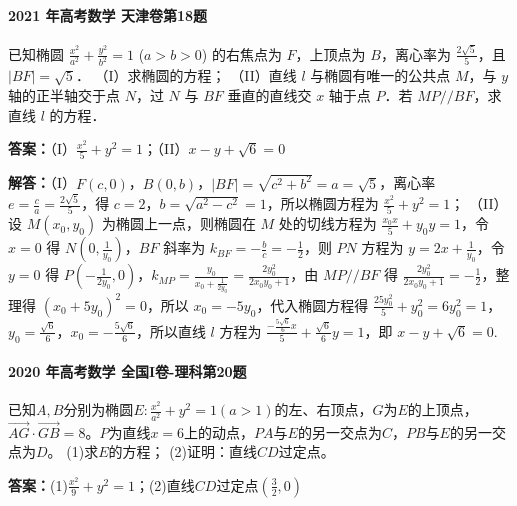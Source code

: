 \documentclass[UTF8,a4paper,11pt]{ctexart}
\begin{document}
\paragraph{2021 年高考数学 天津卷第18题}

已知椭圆 $\frac{x^2}{a^2} + \frac{y^2}{b^2} = 1$ ($a > b > 0$) 的右焦点为 $F$，上顶点为 $B$，离心率为 $\frac{2\sqrt{5}}{5}$，且 $|BF| = \sqrt{5}$．
（I）求椭圆的方程；
（II）直线 $l$ 与椭圆有唯一的公共点 $M$，与 $y$ 轴的正半轴交于点 $N$，过 $N$ 与 $BF$ 垂直的直线交 $x$ 轴于点 $P$．若 $MP // BF$，求直线 $l$ 的方程．

\textbf{答案：}（I）$\frac{x^2}{5} + y^2 = 1$；（II）$x - y + \sqrt{6} = 0$\par

\textbf{解答：}（I）$F(c,0)$，$B(0,b)$，$|BF| = \sqrt{c^2+b^2} = a = \sqrt{5}$，离心率 $e = \frac{c}{a} = \frac{2\sqrt{5}}{5}$，得 $c=2$，$b = \sqrt{a^2-c^2} = 1$，所以椭圆方程为 $\frac{x^2}{5} + y^2 = 1$；
（II）设 $M(x_0,y_0)$ 为椭圆上一点，则椭圆在 $M$ 处的切线方程为 $\frac{x_0 x}{5} + y_0 y = 1$，令 $x=0$ 得 $N\left(0,\frac{1}{y_0}\right)$，$BF$ 斜率为 $k_{BF} = -\frac{b}{c} = -\frac{1}{2}$，则 $PN$ 方程为 $y = 2x + \frac{1}{y_0}$，令 $y=0$ 得 $P\left(-\frac{1}{2y_0},0\right)$，$k_{MP} = \frac{y_0}{x_0+\frac{1}{2y_0}} = \frac{2y_0^2}{2x_0 y_0+1}$，由 $MP // BF$ 得 $\frac{2y_0^2}{2x_0 y_0+1} = -\frac{1}{2}$，整理得 $(x_0+5y_0)^2=0$，所以 $x_0 = -5y_0$，代入椭圆方程得 $\frac{25y_0^2}{5}+y_0^2=6y_0^2=1$，$y_0 = \frac{\sqrt{6}}{6}$，$x_0 = -\frac{5\sqrt{6}}{6}$，所以直线 $l$ 方程为 $\frac{-\frac{5\sqrt{6}}{6}x}{5} + \frac{\sqrt{6}}{6}y = 1$，即 $x - y + \sqrt{6}=0$.

\paragraph{2020 年高考数学 全国I卷-理科第20题}

已知$A,B$分别为椭圆$E:\frac{x^2}{a^2}+y^2=1(a>1)$的左、右顶点，$G$为$E$的上顶点，$\overrightarrow{AG}\cdot\overrightarrow{GB}=8$。$P$为直线$x=6$上的动点，$PA$与$E$的另一交点为$C$，$PB$与$E$的另一交点为$D$。
(1)求$E$的方程；
(2)证明：直线$CD$过定点。

\textbf{答案：}(1)$\frac{x^2}{9}+y^2=1$；(2)直线$CD$过定点$\left(\frac{3}{2},0\right)$\par
\end{document}
